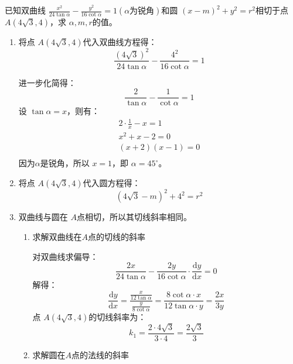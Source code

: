 \documentclass[answers]{exam}
\begin{document}
\begin{questions}
\begin{solution}
\begin{enumerate}[label=\zhnum{*}、, noitemsep]
		\end{enumerate}
	\end{solution}

	\question 已知双曲线 \( \frac{x^2}{24\tan\alpha} - \frac{y^2}{16\cot\alpha} = 1 (\alpha\text{为锐角})\)和圆 \( (x-m)^2 +
	y^2 = r^2 \)相切于点 \( A(4\sqrt{3},4) \)，求 \( \alpha, m, r \)的值。
	\begin{solution}
		\begin{enumerate}[label=\arabic*., noitemsep]
			\item 将点 	\( A(4\sqrt{3}, 4) \)代入双曲线方程得：
			      \begin{equation*}
				      \frac{(4\sqrt{3})^2}{24\tan\alpha} - \frac{4^2}{16\cot\alpha} = 1
			      \end{equation*}

			      进一步化简得：
			      \begin{equation*}
				      \frac{2}{\tan\alpha} - \frac{1}{\cot\alpha} = 1
			      \end{equation*}
			      设 $\tan\alpha=x$，则有：
			      \begin{align*}
				      2\cdot\frac1x - x = 1 \\
				      x^2 +x - 2 = 0        \\
				      (x+2)(x-1) = 0        \\
			      \end{align*}
			      因为$\alpha$是锐角，所以 $x=1$，即 \( \alpha=45^\circ \)。
			\item 将点 \( A(4\sqrt{3}, 4) \)代入圆方程得：
			      \begin{equation*}
				      (4\sqrt{3} - m)^2 + 4^2 = r^2 \tag{a}
			      \end{equation*}
			\item 双曲线与圆在 $A$点相切，所以其切线斜率相同。
			      \begin{enumerate}[label=\alph*., noitemsep]
				      \item 求解双曲线在$A$点的切线的斜率

				            对双曲线求偏导：
				            \begin{equation*}
					            \frac{2x}{24\tan\alpha} - \frac{2y}{16\cot\alpha}\cdot\frac{\text{d}y}{\text{d} x} = 0
				            \end{equation*}
				            解得：
				            \begin{equation*}
					            \frac{\text{d}y}{\text{d}x} = \frac{\frac{x}{12\tan\alpha}}{\frac{y}{8\cot\alpha}}
					            = \frac{8\cot\alpha\cdot x}{12\tan\alpha\cdot y} = \frac{2x}{3y}
				            \end{equation*}
				            点 \( A(4\sqrt{3},4) \)的切线斜率为：
				            \begin{equation*}
					            k_1 = \frac{2\cdot4\sqrt{3}}{3\cdot4} =
					            \frac{2\sqrt{3}}{3}
				            \end{equation*}
				      \item 求解圆在$A$点的法线的斜率


\end{enumerate}
\end{enumerate}
\end{solution}
\end{questions}
\end{document}
